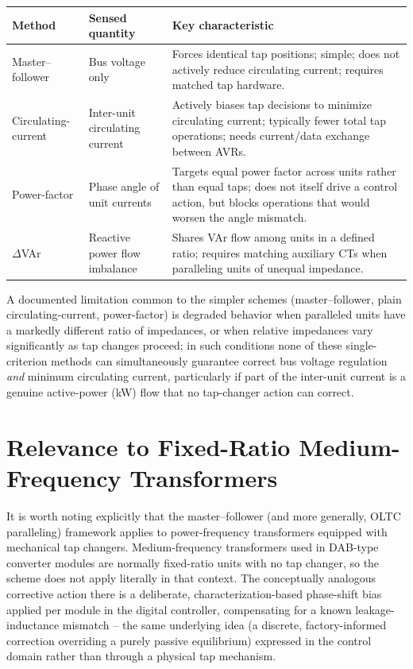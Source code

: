 \documentclass[11pt,a4paper]{article}
\begin{document}
\begin{center}
\begin{tabular}{@{}p{3.3cm}p{4.6cm}p{5.6cm}@{}}
\toprule
Method & Sensed quantity & Key characteristic \\
\midrule
Master--follower & Bus voltage only & Forces identical tap positions; simple; does not actively reduce circulating current; requires matched tap hardware. \\
Circulating-current & Inter-unit circulating current & Actively biases tap decisions to minimize circulating current; typically fewer total tap operations; needs current/data exchange between AVRs. \\
Power-factor & Phase angle of unit currents & Targets equal power factor across units rather than equal taps; does not itself drive a control action, but blocks operations that would worsen the angle mismatch. \\
$\Delta$VAr & Reactive power flow imbalance & Shares VAr flow among units in a defined ratio; requires matching auxiliary CTs when paralleling units of unequal impedance. \\
\bottomrule
\end{tabular}
\end{center}

A documented limitation common to the simpler schemes (master--follower, plain circulating-current, power-factor) is degraded behavior when paralleled units have a markedly different ratio of impedances, or when relative impedances vary significantly as tap changes proceed; in such conditions none of these single-criterion methods can simultaneously guarantee correct bus voltage regulation \emph{and} minimum circulating current, particularly if part of the inter-unit current is a genuine active-power (kW) flow that no tap-changer action can correct.

\section{Relevance to Fixed-Ratio Medium-Frequency Transformers}

It is worth noting explicitly that the master--follower (and more generally, OLTC paralleling) framework applies to power-frequency transformers equipped with mechanical tap changers. Medium-frequency transformers used in DAB-type converter modules are normally fixed-ratio units with no tap changer, so the scheme does not apply literally in that context. The conceptually analogous corrective action there is a deliberate, characterization-based phase-shift bias applied per module in the digital controller, compensating for a known leakage-inductance mismatch -- the same underlying idea (a discrete, factory-informed correction overriding a purely passive equilibrium) expressed in the control domain rather than through a physical tap mechanism.
\end{document}
